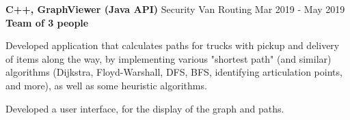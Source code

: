 \begin{cventries}
  \cventry
    {\textbf{C++, GraphViewer (Java API)}}
    {Security Van Routing \href{https://github.com/EduRibeiro00/SecurityVanRouting-feup-cal}{\faExternalLink}} %
    {Mar 2019 - May 2019}
    {\textbf{Team of 3 people}}
    {
      \begin{cvitems} %
        \item {Developed application that calculates paths for trucks with pickup and delivery of items along the way, by implementing various "shortest path" (and similar) algorithms (Dijkstra, Floyd-Warshall, DFS, BFS, identifying articulation points, and more), as well as some heuristic algorithms.}
        \item {Developed a user interface, for the display of the graph and paths.}
      \end{cvitems}
    }

\end{cventries}
